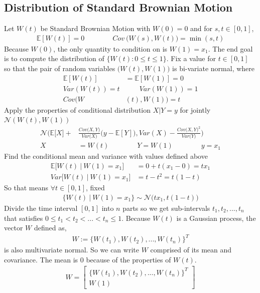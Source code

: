 \documentclass{article}
\newcommand{\NL}{\newline
\newline}
\newcommand{\EX}{\mathbb{E}}
\begin{document}
\subsection{Distribution of Standard Brownian Motion}
Let $W(t)$ be Standard Brownian Motion with $W(0)=0$ and for $s,t\in [0,1]$,
\begin{align*}
    \EX[W(t)]=0\qquad \qquad Cov~\Big(W(s),W(t)\Big)=\min(s,t)
\end{align*}
Because $W(0)$, the only quantity to condition on is $W(1)=x_1$. The end goal is to compute the distribution of $\{W(t):0\leq t\leq1\}$.
\NL
Fix a value for $t\in [0,1]$ so that the pair of random variables $\Big(W(t),W(1)\Big)$ is bi-variate normal, where
\begin{align*}
    \EX[W(t)]&=\EX[W(1)]=0\\
    Var(W(t))=t&\qquad  Var(W(1))=1\\
    Cov\Big(W&(t),W(1)\Big)=t
\end{align*}
Apply the properties of conditional distribution $X|Y=y$ for jointly $\mathcal{N}(W(t),W(1))$
\begin{align*}
    \mathcal{N}\Bigg(\EX\big[X\big]+&\frac{Cov\Big(X,Y\Big)}{Var\Big(X\Big)}\Big(y-\EX[Y]\Big),Var(X)-\frac{Cov\Big(X,Y\Big)^2}{Var\Big(Y\Big)}\Bigg)
    \\
    X&=W(t)\qquad \qquad Y=W(1)\qquad \qquad y=x_1
\end{align*}
Find the conditional mean and variance with values defined above
\begin{align*}
    \EX\Big[W(t)~\Big|~W(1)=x_1\Big]&=0+t(x_1-0)=tx_1\\
    Var\Big[W(t)~\Big|~W(1)=x_1\Big]&=t-t^2=t(1-t)
\end{align*}
So that means $\forall t\in [0,1]$, fixed
\begin{align*}
    \Big\{W(t)~\Big|~W(1)=x_1\Big\}\sim\mathcal{N}\Big(tx_1,t(1-t)\Big)
\end{align*}
Divide the time interval $[0,1]$ into $n$ parts so we get sub-intervals $t_1,t_2,...,t_n$ that satisfies $0\leq t_1<t_2<...<t_n\leq 1$. Because $W(t)$ is a Gaussian process, the vector $W$ defined as,
\begin{align*}
    W:=\Big\{W(t_1),W(t_2),...,W(t_n)\Big\}^T
\end{align*}
is also multivariate normal. So we can write $W$ comprised of its mean and covariance. The mean is 0 because of the properties of $W(t)$.
\begin{align*}
    W=\begin{bmatrix}
        \Big\{W(t_1),W(t_2),...,W(t_n)\Big\}^T\\
        W(1)
    \end{bmatrix}
\end{align*}
\end{document}

